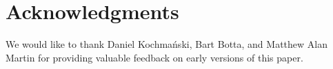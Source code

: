 \section{Acknowledgments} 

We would like to thank Daniel Kochmański, Bart Botta, and Matthew Alan
Martin for providing valuable feedback on early versions of this
paper.

